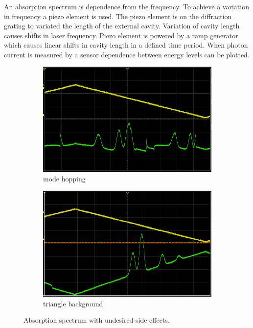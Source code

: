 An absorption spectrum is dependence from the frequency. 
To achieve a variation in frequency a piezo element is used. 
The piezo element is on the diffraction grating to variated the length of the
external cavity. 
Variation of cavity length causes shifts in laser frequency. 
Piezo element is powered by a ramp generator which causes linear shifts in
cavity length in a defined time period.
When photon current is measured by a sensor dependence between energy levels can
be plotted.
\begin{figure}[h]
		\centering
		\begin{subfigure}[b]{0.49\textwidth}
				\begin{center}
				\includegraphics[width=1.0\linewidth]{./content/pictures/scope_136.png}
						\caption{mode hopping}
				\label{fig:piezotest}
				\end{center}
		\end{subfigure}
		\begin{subfigure}[b]{0.49\textwidth}
				\begin{center}
						\includegraphics[width=1.0\linewidth]{./content/pictures/scope_138.png}
						\caption{triangle background}
						\label{fig:rectangular}
				\end{center}
		\end{subfigure}
		\caption{Absorption spectrum with undesired side effects.}
		\label{fig:}
\end{figure}

